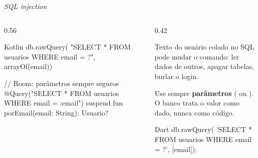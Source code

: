 \documentclass[aspectratio=169,10pt]{beamer}
\begin{document}
\begin{frame}[fragile]{\emph{SQL injection}}
  \begin{columns}[T]
    \begin{column}{0.56\textwidth}
\begin{codigo}[title=CERTO: parâmetros]{Kotlin}
db.rawQuery(
  "SELECT * FROM usuarios WHERE email = ?",
  arrayOf(email))

// Room: parâmetros sempre seguros
@Query("SELECT * FROM usuarios WHERE email = :email")
suspend fun porEmail(email: String): Usuario?
\end{codigo}
    \end{column}
    \begin{column}{0.42\textwidth}
      \begin{erro}[O ataque]
        Texto do usuário colado no SQL pode mudar o comando: ler dados de outros, apagar tabelas, burlar o login.
      \end{erro}
      \begin{conceito}[A defesa]
        Use sempre \textbf{parâmetros} ( ou ). O banco trata o valor como dado, nunca como código.
      \end{conceito}
\begin{codigo}[title=Dart (sqflite)]{Dart}
db.rawQuery(
    'SELECT * FROM usuarios WHERE email = ?', [email]);
\end{codigo}
    \end{column}
  \end{columns}
\end{frame}
\end{document}
